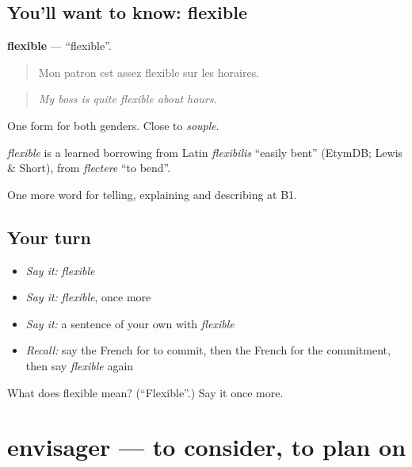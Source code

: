 \subsection*{You'll want to know: flexible}
\textbf{flexible} — \textquotedblleft{}flexible\textquotedblright{}.

\begin{quote}
Mon patron est assez flexible sur les horaires.
\end{quote}

\begin{quote}
\emph{My boss is quite flexible about hours.}
\end{quote}

One form for both genders. Close to \emph{souple}.

\begin{cousinweb}
\emph{flexible} is a learned borrowing from Latin \emph{flexibilis} \textquotedblleft{}easily bent\textquotedblright{} (EtymDB; Lewis \& Short), from \emph{flectere} \textquotedblleft{}to bend\textquotedblright{}.
\end{cousinweb}

\begin{grammarlens}[title={What you've built}]
One more word for telling, explaining and describing at B1.
\end{grammarlens}

\subsection*{Your turn}
\begin{itemize}
\raggedright
  \item \emph{Say it:} \emph{flexible}
  \item \emph{Say it:} \emph{flexible}, once more
  \item \emph{Say it:} a sentence of your own with \emph{flexible}
  \item \emph{Recall:} say the French for to commit, then the French for the commitment, then say \emph{flexible} again
\end{itemize}

\begin{tcolorbox}[breakable,colback=teal!4,colframe=teal!35!black,title={Before you move on}]
What does flexible mean? (\textquotedblleft{}Flexible\textquotedblright{}.) Say it once more.
\end{tcolorbox}
\section[envisager]{envisager — to consider, to plan on}

